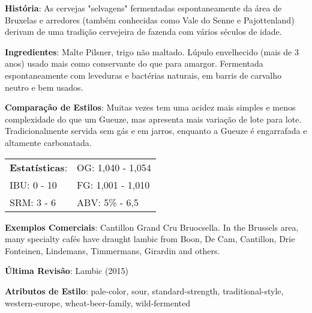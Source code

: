 \textbf{História}: As cervejas "selvagens" fermentadas espontaneamente da área de Bruxelas e arredores (também conhecidas como Vale do Senne e Pajottenland) derivam de uma tradição cervejeira de fazenda com vários séculos de idade.

\textbf{Ingredientes}: Malte Pilsner, trigo não maltado. Lúpulo envelhecido (mais de 3 anos) usado mais como conservante do que para amargor. Fermentada espontaneamente com leveduras e bactérias naturais, em barris de carvalho neutro e bem usados.

\textbf{Comparação de Estilos}: Muitas vezes tem uma acidez mais simples e menos complexidade do que um Gueuze, mas apresenta mais variação de lote para lote. Tradicionalmente servida sem gás e em jarros, enquanto a Gueuze é engarrafada e altamente carbonatada.

\begin{tabular}{@{}p{35mm}p{35mm}@{}}
  \textbf{Estatísticas}: & OG: 1,040 - 1,054 \\
  IBU: 0 - 10  & FG: 1,001 - 1,010  \\
  SRM: 3 - 6  & ABV: 5\% - 6,5%
\end{tabular}

\textbf{Exemplos Comerciais}: Cantillon Grand Cru Bruocsella. In the Brussels area, many specialty cafés have draught lambic from Boon, De Cam, Cantillon, Drie Fonteinen, Lindemans, Timmermans, Girardin and others.

\textbf{Última Revisão}: Lambic (2015)

\textbf{Atributos de Estilo}: pale-color, sour, standard-strength, traditional-style, western-europe, wheat-beer-family, wild-fermented
